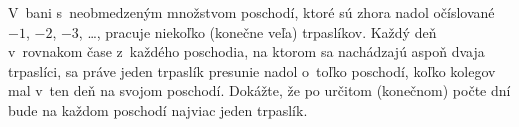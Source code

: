 \createTaskHeader
V~bani s~neobmedzeným množstvom poschodí, ktoré sú zhora nadol očíslované $-1$, $-2$, $-3$, \dots,
pracuje niekoľko (konečne veľa) trpaslíkov. Každý deň v~rovnakom čase z~každého poschodia, na ktorom
sa nachádzajú aspoň dvaja trpaslíci, sa práve jeden trpaslík presunie nadol o~toľko poschodí,
koľko kolegov mal v~ten deň na svojom poschodí.
Dokážte, že po určitom (konečnom) počte dní bude na každom poschodí najviac jeden trpaslík.
